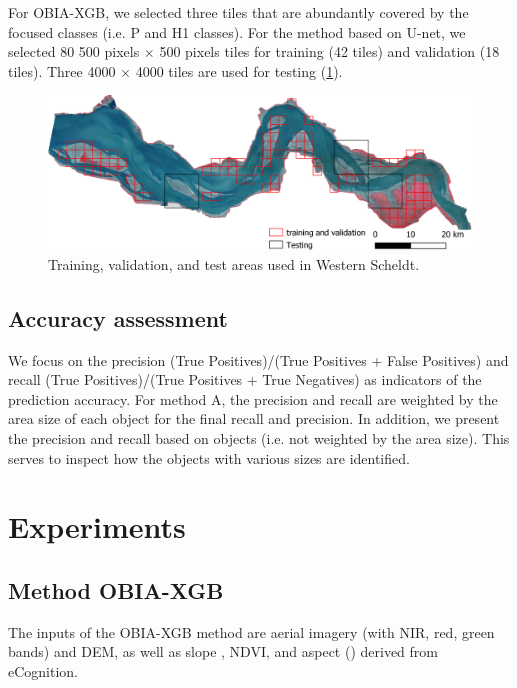 \documentclass{isprs} %
\begin{document}
For OBIA-XGB, we selected three tiles that are abundantly covered by the focused classes (i.e. P and H1 classes). For the method based on U-net, we selected 80 500 pixels $\times$ 500 pixels tiles for training (42 tiles) and validation (18 tiles). Three 4000 $\times$ 4000 tiles are used for testing (\cref{fig:tt}). 

\begin{figure}
    \centering
    \includegraphics[scale = 0.3]{figures/train_test_tileOverview.png}
    \caption{Training, validation, and test areas used in Western Scheldt.}
    \label{fig:tt}
\end{figure}

\subsection{Accuracy assessment}

We focus on the precision (True Positives)/(True Positives + False Positives) and recall (True Positives)/(True Positives + True Negatives) as indicators of the prediction accuracy.  
For method A, the precision and recall are weighted by the area size of each object for the final recall and precision. In addition, we present the precision and recall based on objects (i.e. not weighted by the area size). This serves to inspect how the objects with various sizes are identified.  

\section{Experiments}

\subsection{Method OBIA-XGB}

The inputs of the OBIA-XGB method are aerial imagery (with NIR, red, green bands) and DEM, as well as slope \citep{zevenbergen1987quantitative}, NDVI, and aspect (\citep{horn1981hill}) derived from eCognition. 
\end{document}
